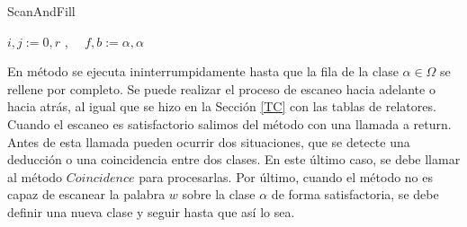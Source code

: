 \begin{center}
\begin{minipage}{.6\linewidth}
    \begin{algorithm}[H] 
    \SetAlgoLined
    
    	\caption{ScanAndFill}

    	    $i, j := 0, r$ , $\quad f, b := \alpha, \alpha$  \\
            
        
    \end{algorithm} 
\end{minipage}
\end{center}

En método se ejecuta ininterrumpidamente hasta que la fila de la clase $\alpha \in \Omega$ se rellene por completo. Se puede realizar el proceso de escaneo hacia adelante o hacia atrás, al igual que se hizo en la Sección \ref{TC} con las tablas de relatores.
Cuando el escaneo es satisfactorio salimos del método con una llamada a return. Antes de esta llamada pueden ocurrir dos situaciones, que se detecte una deducción o una coincidencia entre dos clases. En este último caso,  se debe llamar al método $Coincidence$ para procesarlas.
Por último, cuando el método no es capaz de escanear la palabra $w$ sobre la clase $\alpha$ de forma satisfactoria, se debe definir una nueva clase y seguir hasta que así lo sea.







